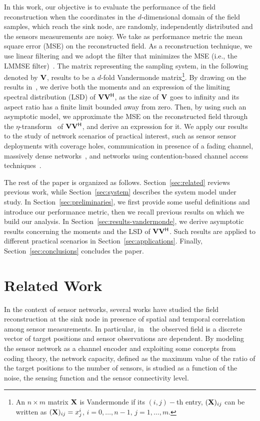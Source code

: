 \documentclass[11pt, draftcls, onecolumn, a4paper]{IEEEtran}
\newcommand{\Vm}{{\bf V}}
\newcommand{\Xm}{{\bf X}}
\def\Herm{\mathsf{^H}}
\begin{document}
In this work, our objective is to evaluate the performance of the
field reconstruction when the coordinates in the $d$-dimensional
domain of the field samples, which reach the sink node, are randomly,
independently distributed and the sensors measurements are noisy.  We
take as performance metric the mean square error (MSE) on the
reconstructed field. As a reconstruction technique, we use linear
filtering and we adopt the filter that minimizes the MSE (i.e., the
LMMSE filter)~\cite{TSP1,TSP2,TSP3}.
The matrix representing the sampling system, in the following denoted
by $\Vm$, results to be a $d$-fold Vandermonde matrix\footnote{An $n
  \times m$ matrix $\Xm$ is Vandermonde if its $(i,j)-$th entry,
  $(\Xm)_{ij}$ can be written as $(\Xm)_{ij}=x_j^i$, $i=0,\ldots,n-1,
  \, j=1,\ldots,m$.}.  By drawing on the results
in~\cite{TSP2,RyanDebbah}, we derive both the moments and an
expression of the limiting spectral distribution (LSD) of
$\Vm\Vm\Herm$, as the size of $\Vm$ goes to infinity and its aspect
ratio has a finite limit bounded away from zero.  Then, by using such
an asymptotic model, we approximate the MSE on the reconstructed field
through the $\eta$-transform~\cite{tutorial} of $\Vm\Vm\Herm$, and
derive an expression for it.
We apply our results to the study of network scenarios of practical
interest, such as sensor sensor deployments with coverage holes,
communication in presence of a fading channel, massively dense networks~\cite{massdense1, massdense2}, 
and networks using contention-based channel access
techniques~\cite{802.15.4}.


The rest of the paper is organized as follows.
Section~\ref{sec:related} reviews previous work, while  
Section~\ref{sec:system} describes the system model
under study.
In Section~\ref{sec:preliminaries}, we first provide some useful definitions
and introduce our performance
metric, then  we recall previous results on which we build our
analysis.  
In Section~\ref{sec:results-vandermonde}, we derive asymptotic results
concerning the moments and the LSD of $\Vm\Vm\Herm$. Such results are applied to
different practical scenarios in Section~\ref{sec:applications}.
Finally, Section~\ref{sec:conclusions} concludes the paper.


\section{Related Work\label{sec:related}}
In the context of sensor networks, several works \cite{CristescuVetterli,Poor,Vuran04,Rachlin1} have studied the field reconstruction at the
sink node in presence of spatial and temporal correlation among 
sensor measurements.  In
particular, in~\cite{Rachlin1} the observed field is a discrete vector
of target positions and sensor observations are dependent. By modeling
the sensor network as a channel encoder and exploiting some concepts
from coding theory, the network capacity, defined as the maximum value of the
ratio of the target positions to the number of sensors, 
is studied as a function of
the noise, the sensing function and the sensor connectivity level.
 
\end{document}
